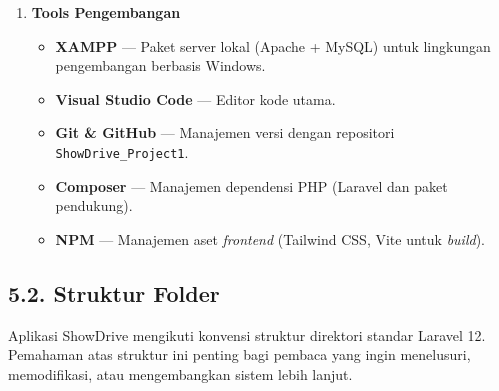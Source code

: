 \documentclass[11pt, a5paper]{article}
\begin{document}
\begin{enumerate}[label=\arabic*.]
  \item \textbf{Tools Pengembangan}
    \begin{itemize}
      \item \textbf{XAMPP} --- Paket server lokal (Apache + MySQL) untuk
            lingkungan pengembangan berbasis Windows.
      \item \textbf{Visual Studio Code} --- Editor kode utama.
      \item \textbf{Git \& GitHub} --- Manajemen versi dengan repositori
            \texttt{ShowDrive\_Project1}.
      \item \textbf{Composer} --- Manajemen dependensi PHP (Laravel dan paket
            pendukung).
      \item \textbf{NPM} --- Manajemen aset \textit{frontend} (Tailwind CSS,
            Vite untuk \textit{build}).
    \end{itemize}
\end{enumerate}

\subsection*{5.2. Struktur Folder}

Aplikasi ShowDrive mengikuti konvensi struktur direktori standar Laravel 12.
Pemahaman atas struktur ini penting bagi pembaca yang ingin menelusuri,
memodifikasi, atau mengembangkan sistem lebih lanjut.
\end{document}
